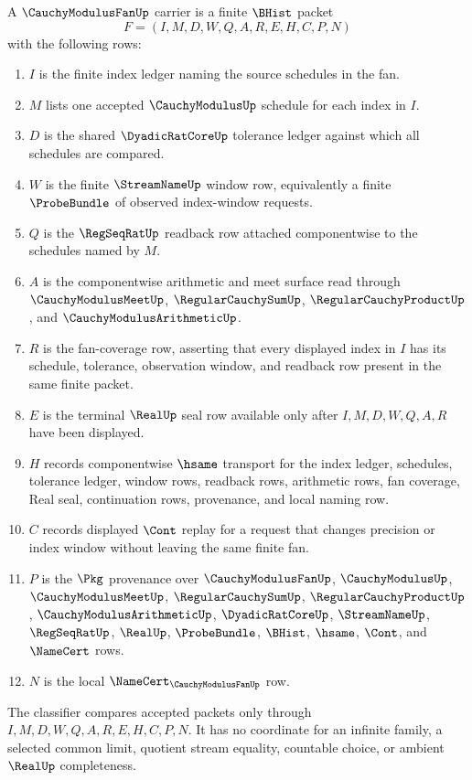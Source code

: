 \begin{definition}
\label{def:cauchy-modulus-fan-carrier}
A $\CauchyModulusFanUp$ carrier is a finite $\BHist$ packet
$$
F=(I,M,D,W,Q,A,R,E,H,C,P,N)
$$
with the following rows:
\begin{enumerate}
\item $I$ is the finite index ledger naming the source schedules in the fan.
\item $M$ lists one accepted $\CauchyModulusUp$ schedule for each index in $I$.
\item $D$ is the shared $\DyadicRatCoreUp$ tolerance ledger against which all schedules are compared.
\item $W$ is the finite $\StreamNameUp$ window row, equivalently a finite $\ProbeBundle$ of observed index-window requests.
\item $Q$ is the $\RegSeqRatUp$ readback row attached componentwise to the schedules named by $M$.
\item $A$ is the componentwise arithmetic and meet surface read through $\CauchyModulusMeetUp$, $\RegularCauchySumUp$, $\RegularCauchyProductUp$, and $\CauchyModulusArithmeticUp$.
\item $R$ is the fan-coverage row, asserting that every displayed index in $I$ has its schedule, tolerance, observation window, and readback row present in the same finite packet.
\item $E$ is the terminal $\RealUp$ seal row available only after $I,M,D,W,Q,A,R$ have been displayed.
\item $H$ records componentwise $\hsame$ transport for the index ledger, schedules, tolerance ledger, window rows, readback rows, arithmetic rows, fan coverage, Real seal, continuation rows, provenance, and local naming row.
\item $C$ records displayed $\Cont$ replay for a request that changes precision or index window without leaving the same finite fan.
\item $P$ is the $\Pkg$ provenance over $\CauchyModulusFanUp$, $\CauchyModulusUp$, $\CauchyModulusMeetUp$, $\RegularCauchySumUp$, $\RegularCauchyProductUp$, $\CauchyModulusArithmeticUp$, $\DyadicRatCoreUp$, $\StreamNameUp$, $\RegSeqRatUp$, $\RealUp$, $\ProbeBundle$, $\BHist$, $\hsame$, $\Cont$, and $\NameCert$ rows.
\item $N$ is the local $\NameCert_{\CauchyModulusFanUp}$ row.
\end{enumerate}
The classifier compares accepted packets only through $I,M,D,W,Q,A,R,E,H,C,P,N$. It has no coordinate for an infinite family, a selected common limit, quotient stream equality, countable choice, or ambient $\RealUp$ completeness.
\end{definition}

